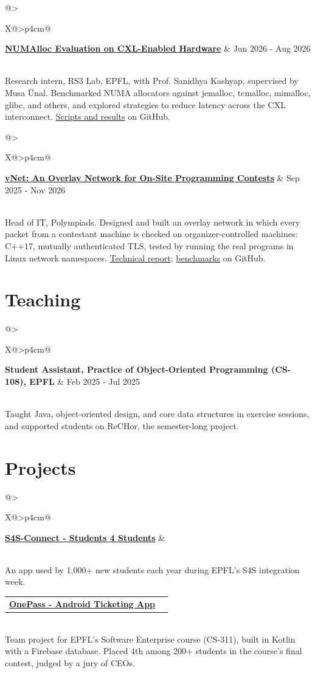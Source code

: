 \documentclass[a4paper,11pt]{article}
\makeatletter
\newenvironment{jobshort}[2]
{\noindent\begin{tabularx}{\linewidth}{@{}>{\raggedright\arraybackslash}X@{\hspace{1em}}>{\raggedleft\arraybackslash}p{4cm}@{}}
\textbf{#1} & #2
\end{tabularx}\\}
{\vspace{2pt}}
\makeatother
\begin{document}
\begin{jobshort}{\href{https://adam.bekkar.ch/papers/numalloc-cxl/}{NUMAlloc Evaluation on CXL-Enabled Hardware}}{Jun 2026 - Aug 2026}
Research intern, RS3 Lab, EPFL, with Prof. Sanidhya Kashyap, supervised by Musa \"Unal. Benchmarked NUMA allocators against jemalloc, tcmalloc, mimalloc, glibc, and others, and explored strategies to reduce latency across the CXL interconnect. \href{https://github.com/Zeleph25/cxl-alloc-benchmarks}{Scripts and results} on GitHub.
\end{jobshort}

\begin{jobshort}{\href{https://github.com/polympiads/vNet}{vNet: An Overlay Network for On-Site Programming Contests}}{Sep 2025 - Nov 2026}
Head of IT, Polympiads. Designed and built an overlay network in which every packet from a contestant machine is checked on organizer-controlled machines: C++17, mutually authenticated TLS, tested by running the real programs in Linux network namespaces. \href{https://adam.bekkar.ch/papers/vnet/}{Technical report}; \href{https://github.com/polympiads/vNet-benchmarks}{benchmarks} on GitHub.
\end{jobshort}

\section{Teaching}
\begin{jobshort}{Student Assistant, Practice of Object-Oriented Programming (CS-108), EPFL}{Feb 2025 - Jul 2025}
Taught Java, object-oriented design, and core data structures in exercise sessions, and supported students on ReCHor, the semester-long project.
\end{jobshort}

\section{Projects}
\begin{jobshort}{\href{https://students4students.ch}{S4S-Connect - Students 4 Students}}{}
An app used by 1,000+ new students each year during EPFL's S4S integration week.
\end{jobshort}

\begin{jobshort}{\href{https://github.com/onepass-ch/onepass}{OnePass - Android Ticketing App}}{}
Team project for EPFL's Software Enterprise course (CS-311), built in Kotlin with a Firebase database. Placed 4th among 200+ students in the course's final contest, judged by a jury of CEOs.
\end{jobshort}
\end{document}
